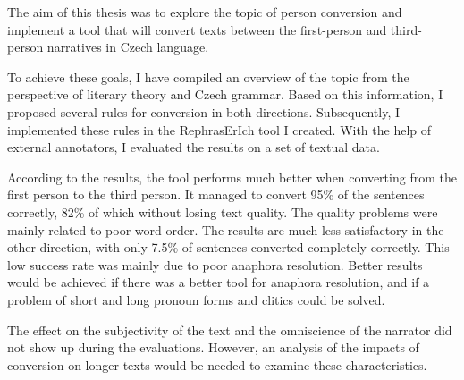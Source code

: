 The aim of this thesis was to explore the topic of person conversion and implement a tool that will convert texts between the first-person and third-person narratives in Czech language.

To achieve these goals, I have compiled an overview of the topic from the perspective of literary theory and Czech grammar. Based on this information, I proposed several rules for conversion in both directions. Subsequently, I implemented these rules in the RephrasErIch tool I created. With the help of external annotators, I evaluated the results on a set of textual data.

According to the results, the tool performs much better when converting from the first person to the third person. It managed to convert 95\% of the sentences correctly, 82\% of which without losing text quality. The quality problems were mainly related to poor word order. The results are much less satisfactory in the other direction, with only 7.5\% of sentences converted completely correctly. This low success rate was mainly due to poor anaphora resolution. Better results would be achieved if there was a better tool for anaphora resolution, and if a problem of short and long pronoun forms and clitics could be solved.

The effect on the subjectivity of the text and the omniscience of the narrator did not show up during the evaluations. However, an analysis of the impacts of conversion on longer texts would be needed to examine these characteristics.
